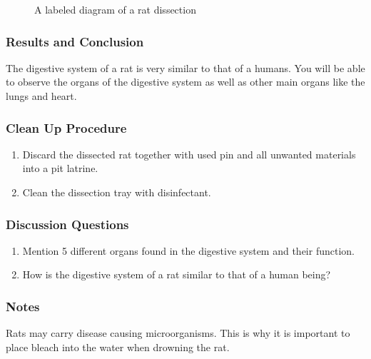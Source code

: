 \begin{figure}[h]
\begin{center}
\def\svgwidth{10cm}

\caption{A labeled diagram of a rat dissection}
\label{fig:rat-dissection}
\end{center}
\end{figure}

\subsubsection*{Results and Conclusion}
The digestive system of a rat is very similar to that of a humans. You will be able to observe the organs of the digestive system as well as other main organs like the lungs and heart.

\subsubsection*{Clean Up Procedure}
\begin{enumerate}
\item{Discard the dissected rat together with used pin and all unwanted materials into a pit latrine.}
\item{Clean the dissection tray with disinfectant.}
\end{enumerate}

\subsubsection*{Discussion Questions}
\begin{enumerate}
\item{Mention 5 different organs found in the digestive system and their function.}
\item{How is the digestive system of a rat similar to that of a human being?}
\end{enumerate}

\subsubsection*{Notes}
Rats may carry disease causing microorganisms. This is why it is important to place bleach into the water when drowning the rat.

